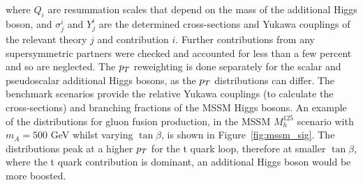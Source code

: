 where $Q_i$ are resummation scales that depend on the mass of the additional Higgs boson, and $\sigma^{i}_{j}$ and $Y^{i}_{j}$ are the determined cross-sections and Yukawa couplings of the relevant theory $j$ and contribution $i$.
Further contributions from any supersymmetric partners were checked and accounted for less than a few percent and so are neglected.
The $p_{T}$ reweighting is done separately for the scalar and pseudoscalar additional Higgs bosons, as the $p_{T}$ distributions can differ.
The benchmark scenarios provide the relative Yukawa couplings (to calculate the cross-sections) and branching fractions of the \ac{MSSM} Higgs bosons.
An example of the distributions for gluon fusion production, in the \ac{MSSM} $M_{h}^{125}$ scenario with $m_{A} = 500$ GeV whilst varying $\tan\beta$, is shown in Figure~\ref{fig:mssm_sig}.
The distributions peak at a higher $p_{T}$ for the t quark loop, therefore at smaller $\tan\beta$, where the t quark contribution is dominant, an additional Higgs boson would be more boosted. \\

